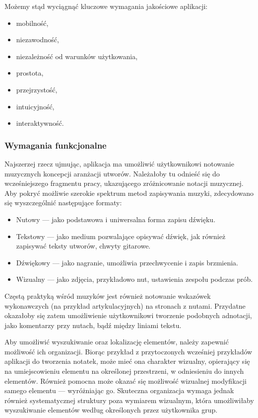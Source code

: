 \documentclass[12pt]{article}
\begin{document}
Możemy stąd wyciągnąć kluczowe wymagania jakościowe aplikacji:
\begin{itemize}
	\item mobilność,
	\item niezawodność,
	\item niezależność od warunków użytkowania,
	\item prostota,
	\item przejrzystość,
	\item intuicyjność,
	\item interaktywność.
\end{itemize}

\subsubsection{Wymagania funkcjonalne}
Najszerzej rzecz ujmując, aplikacja ma umożliwić użytkownikowi notowanie muzycznych koncepcji aranżacji utworów.
Należałoby tu odnieść się do wcześniejszego fragmentu pracy, ukazującego zróżnicowanie notacji muzycznej.
Aby pokryć możliwie szerokie spektrum metod zapisywania muzyki, zdecydowano się wyszczególnić następujące formaty:
\begin{itemize}
	\item Nutowy — jako podstawowa i uniwersalna forma zapisu dźwięku.
	\item Tekstowy — jako medium pozwalające opisywać dźwięk, jak również zapisywać teksty utworów, chwyty gitarowe.
	\item Dźwiękowy — jako nagranie, umożliwia przechwycenie i zapis brzmienia.
	\item Wizualny — jako zdjęcia, przykładowo nut, ustawienia zespołu podczas prób.
\end{itemize}

Częstą praktyką wśród muzyków jest również notowanie wskazówek wykonawczych (na przykład artykulacyjnych)
na stronach z nutami.
Przydatne okazałoby się zatem umożliwienie użytkownikowi tworzenie podobnych adnotacji, jako komentarzy przy nutach,
bądź między liniami tekstu.

Aby umożliwić wyszukiwanie oraz lokalizację elementów, należy zapewnić możliwość ich organizacji.
Biorąc przykład z przytoczonych wcześniej przykładów aplikacji do tworzenia notatek, może mieć ona charakter wizualny,
opierający się na umiejscowieniu elementu na określonej przestrzeni, w odniesieniu do innych elementów.
Również pomocna może okazać się możliwość wizualnej modyfikacji samego elementu — wyróżniając go.
Skuteczna organizacja wymaga jednak również systematycznej struktury poza wymiarem wizualnym, która umożliwiłaby wyszukiwanie
elementów według określonych przez użytkownika grup.
\end{document}
